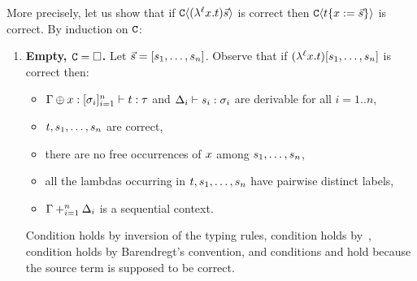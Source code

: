   More precisely, let us show that
  if $\mathtt{C}\langle(\lambda^{\ell} x. t)\vec{s}\rangle$ is correct
  then $\mathtt{C}\langle t\{x := \vec{s}\}\rangle$ is correct.
  By induction on $\mathtt{C}$:
  \begin{enumerate}
  \item {\bf Empty, $\mathtt{C} = \Box$.}
    \label{subject_reduction__case_base_empty_context}
    Let $\vec{s} = [s_1,\hdots,s_n]$.
    Observe that if $(\lambda^{\ell} x. t)[s_1,\hdots,s_n]$ is correct then:
    \begin{itemize}
    \item {} $\Gamma \oplus x : [\sigma_i]_{i=1}^{n} \vdash t : \tau$ and $\Delta_i \vdash s_i : \sigma_i$ are derivable for all $i=1..n$,
    \item {} $t,s_1,\hdots,s_n$ are correct,
    \item {} there are no free occurrences of $x$ among $s_1,\hdots,s_n$,
    \item {} all the lambdas occurring in $t,s_1,\hdots,s_n$ have pairwise distinct labels,
    \item {} $\Gamma +_{i=1}^n \Delta_i$ is a sequential context.
    \end{itemize}
    Condition  holds by inversion of the typing rules,
    condition  holds by~,
    condition  holds by Barendregt's convention,
    and conditions  and  hold because the source term is supposed to be correct.


\end{enumerate}
